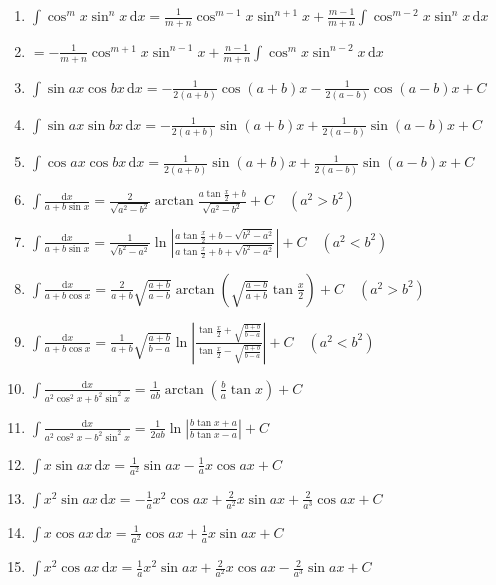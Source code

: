 \begin{enumerate}
    \item $\displaystyle \int \cos^m x \sin^n x \, \mathrm{d}x = \frac{1}{m + n} \cos^{m-1} x \sin^{n+1} x + \frac{m - 1}{m + n} \int \cos^{m-2} x \sin^n x \, \mathrm{d}x$
    \item[] $\displaystyle = -\frac{1}{m + n} \cos^{m+1} x \sin^{n-1} x + \frac{n - 1}{m + n} \int \cos^m x \sin^{n-2} x \, \mathrm{d}x$
    \item $\displaystyle \int \sin ax \cos bx \, \mathrm{d}x = -\frac{1}{2(a + b)} \cos(a + b)x - \frac{1}{2(a - b)} \cos(a - b)x + C$
    \item $\displaystyle \int \sin ax \sin bx \, \mathrm{d}x = -\frac{1}{2(a + b)} \sin(a + b)x + \frac{1}{2(a - b)} \sin(a - b)x + C$
    \item $\displaystyle \int \cos ax \cos bx \, \mathrm{d}x = \frac{1}{2(a + b)} \sin(a + b)x + \frac{1}{2(a - b)} \sin(a - b)x + C$
    \item $\displaystyle \int \frac{\mathrm{d}x}{a + b \sin x} = \frac{2}{\sqrt{a^2 - b^2}} \arctan \frac{a \tan \frac{x}{2} + b}{\sqrt{a^2 - b^2}} + C \quad (a^2 > b^2)$
    \item $\displaystyle \int \frac{\mathrm{d}x}{a + b \sin x} = \frac{1}{\sqrt{b^2 - a^2}} \ln \left| \frac{a \tan \frac{x}{2} + b - \sqrt{b^2 - a^2}}{a \tan \frac{x}{2} + b + \sqrt{b^2 - a^2}} \right| + C \quad (a^2 < b^2)$
    \item $\displaystyle \int \frac{\mathrm{d}x}{a + b \cos x} = \frac{2}{a + b} \sqrt{\frac{a + b}{a - b}} \arctan \left( \sqrt{\frac{a - b}{a + b}} \tan \frac{x}{2} \right) + C \quad (a^2 > b^2)$
    \item $\displaystyle \int \frac{\mathrm{d}x}{a + b \cos x} = \frac{1}{a + b} \sqrt{\frac{a + b}{b - a}} \ln \left| \frac{\tan \frac{x}{2} + \sqrt{\frac{a + b}{b - a}}}{\tan \frac{x}{2} - \sqrt{\frac{a + b}{b - a}}} \right| + C \quad (a^2 < b^2)$
    \item $\displaystyle \int \frac{\mathrm{d}x}{a^2 \cos^2 x + b^2 \sin^2 x} = \frac{1}{ab} \arctan \left( \frac{b}{a} \tan x \right) + C$
    \item $\displaystyle \int \frac{\mathrm{d}x}{a^2 \cos^2 x - b^2 \sin^2 x} = \frac{1}{2ab} \ln \left| \frac{b \tan x + a}{b \tan x - a} \right| + C$
    \item $\displaystyle \int x \sin ax \, \mathrm{d}x = \frac{1}{a^2} \sin ax - \frac{1}{a} x \cos ax + C$
    \item $\displaystyle \int x^2 \sin ax \, \mathrm{d}x = -\frac{1}{a} x^2 \cos ax + \frac{2}{a^2} x \sin ax + \frac{2}{a^3} \cos ax + C$
    \item $\displaystyle \int x \cos ax \, \mathrm{d}x = \frac{1}{a^2} \cos ax + \frac{1}{a} x \sin ax + C$
    \item $\displaystyle \int x^2 \cos ax \, \mathrm{d}x = \frac{1}{a} x^2 \sin ax + \frac{2}{a^2} x \cos ax - \frac{2}{a^3} \sin ax + C$
\end{enumerate}

